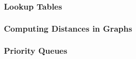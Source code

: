 \subsubsection{Lookup Tables}


\subsubsection{Computing Distances in Graphs}


\subsubsection{Priority Queues}





































\endinput

BEGIN OLD STUFF...


TODO: Work on this:

Let us now look at the |graph_drawing_algorithm| function in more
detail. It takes a single parameter \meta{info}, which must be a
table, and does the following:


